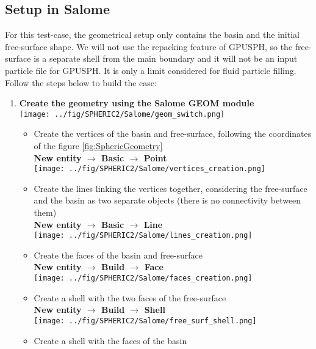\documentclass{../GPUSPHtemplate}
\begin{document}
\subsection{Setup in Salome}\label{sec:salome_spheric2}
For this test-case, the geometrical setup only contains the basin and the initial free-surface shape.
We will not use the repacking feature of GPUSPH, so the free-surface is a separate shell from the
main boundary and it will not be an input particle file for GPUSPH. It is only a limit considered for
fluid particle filling. Follow the steps below to build the case:
\begin{enumerate}
\item \textbf{Create the geometry using the Salome GEOM module}\smallskip\\
  \texttt{[image: ../fig/SPHERIC2/Salome/geom\_switch.png]}
  \begin{itemize}
  \item Create the vertices of the basin and free-surface, following the coordinates of the figure \ref{fig:SphericGeometry}\\
    \textbf{New entity $\to$ Basic $\to$ Point}\smallskip\\
    \texttt{[image: ../fig/SPHERIC2/Salome/vertices\_creation.png]}
  \item Create the lines linking the vertices together, considering the free-surface and the basin as two separate objects
    (there is no connectivity between them)\\
    \textbf{New entity $\to$ Basic $\to$ Line}\smallskip\\
    \texttt{[image: ../fig/SPHERIC2/Salome/lines\_creation.png]}
  \item Create the faces of the basin and free-surface\\
    \textbf{New entity $\to$ Build $\to$ Face}\smallskip\\
    \texttt{[image: ../fig/SPHERIC2/Salome/faces\_creation.png]}
  \item Create a shell with the two faces of the free-surface\\
    \textbf{New entity $\to$ Build $\to$ Shell}\smallskip\\
    \texttt{[image: ../fig/SPHERIC2/Salome/free\_surf\_shell.png]}
  \item Create a shell with the faces of the basin\\

\end{itemize}
\end{enumerate}
\end{document}
